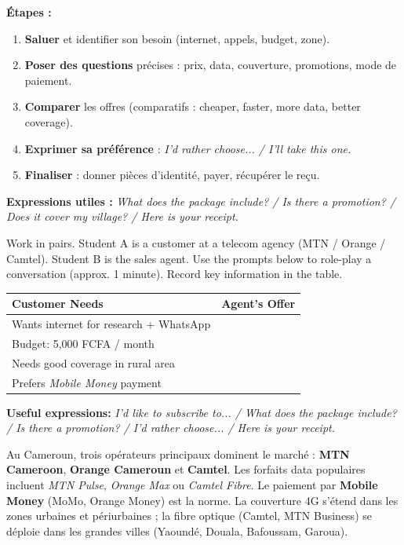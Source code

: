 \documentclass[11pt]{article}
\begin{document}
\begin{methode}
\textbf{Étapes :}
\begin{enumerate}
\item \textbf{Saluer} et identifier son besoin (internet, appels, budget, zone).
\item \textbf{Poser des questions} précises : prix, data, couverture, promotions, mode de paiement.
\item \textbf{Comparer} les offres (comparatifs : cheaper, faster, more data, better coverage).
\item \textbf{Exprimer sa préférence} : \textit{I'd rather choose... / I'll take this one.}
\item \textbf{Finaliser} : donner pièces d'identité, payer, récupérer le reçu.
\end{enumerate}
\textbf{Expressions utiles :} \textit{What does the package include? / Is there a promotion? / Does it cover my village? / Here is your receipt.}
\end{methode}

\begin{exercice}
Work in pairs. Student A is a customer at a telecom agency (MTN / Orange / Camtel). Student B is the sales agent.
Use the prompts below to role-play a conversation (approx. 1 minute). Record key information in the table.

\begin{center}
\begin{tabularx}{\linewidth}{|l|X|}\hline
\textbf{Customer Needs} & \textbf{Agent's Offer} \\\hline
Wants internet for research + WhatsApp & \dotfill \\\hline
Budget: 5,000 FCFA / month & \dotfill \\\hline
Needs good coverage in rural area & \dotfill \\\hline
Prefers \textit{Mobile Money} payment & \dotfill \\\hline
\end{tabularx}
\end{center}

\textbf{Useful expressions:} \textit{I'd like to subscribe to... / What does the package include? / Is there a promotion? / I'd rather choose... / Here is your receipt.}
\end{exercice}

\begin{savaistu}
Au Cameroun, trois opérateurs principaux dominent le marché : \textbf{MTN Cameroon}, \textbf{Orange Cameroun} et \textbf{Camtel}. Les forfaits data populaires incluent \textit{MTN Pulse}, \textit{Orange Max} ou \textit{Camtel Fibre}. Le paiement par \textbf{Mobile Money} (MoMo, Orange Money) est la norme. La couverture 4G s'étend dans les zones urbaines et périurbaines ; la fibre optique (Camtel, MTN Business) se déploie dans les grandes villes (Yaoundé, Douala, Bafoussam, Garoua).
\end{savaistu}
\end{document}
